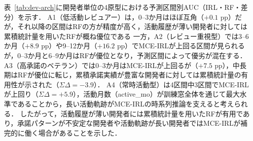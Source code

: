 \documentclass[submit,noauthor,ses,dvipdfmx]{ipsj}
\newcommand{\todo}[1]{\colorbox{yellow}{{\bf TODO}:}{\color{red} {\textbf{[#1]}}}}
\begin{document}
表~\ref{tab:dev-arch}に開発者単位の4原型における予測区間別AUC（IRL・RF・差分）を示す．
A1（低活動レビュアー）は，0--3か月はほぼ互角（$+0.1$ pp）だが，それ以降の区間はRFの方が精度が高く，活動履歴が薄い開発者に対しては累積統計量を用いたRFが概ね優位である
一方，A2（レビュー重視型）では3--6か月（$+8.9$ pp）や9--12か月（$+16.2$ pp）でMCE-IRLが上回る区間が見られるが，0--3か月と6--9か月はRFが優位となり，予測区間によって優劣が混在する．
A3（高承諾のベテラン）では0--3か月はMCE-IRLが上回るが（$+7.5$ pp），中長期はRFが優位に転じ，累積承諾実績が豊富な開発者に対しては累積統計量の有用性が示された（$\Sigma\Delta = -3.9$）．
A4（常時活動型）は4区間中3区間でMCE-IRLが上回り（$\Sigma\Delta = +5.9$），活動月数（active\_mo）が訓練窓全体を通じて最大水準であることから，長い活動軌跡がMCE-IRLの時系列推論を支えると考えられる．
したがって，活動履歴が薄い開発者には累積統計量を用いたRFが有用であり，承諾パターンが不安定な開発者や活動軌跡が長い開発者ではMCE-IRLが補完的に働く場合があることを示した．




\end{document}
